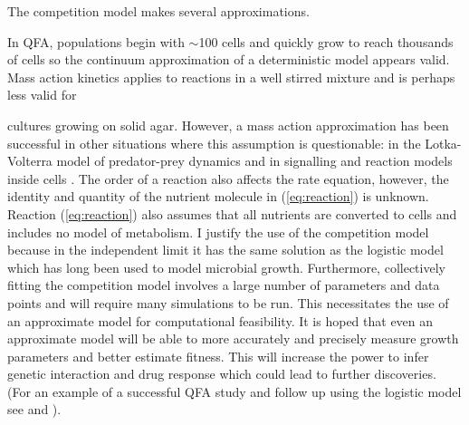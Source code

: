 
The competition model makes several approximations.


In QFA, populations begin with \(\sim\)100 cells and quickly grow to
reach thousands of cells so the continuum approximation of a
deterministic model appears valid. Mass action kinetics applies to
reactions in a well stirred mixture and is perhaps less valid for

cultures growing on solid agar. However, a mass action approximation
has been successful in other situations where this assumption is
questionable: in the Lotka-Volterra model of predator-prey dynamics
\citep{Berryman1992} and in signalling and reaction models inside
cells \citep{Aldridge2006,Chen2010}. The order of a reaction also
affects the rate equation, however, the identity and quantity of the
nutrient molecule in (\ref{eq:reaction}) is unknown. Reaction
(\ref{eq:reaction}) also assumes that all nutrients are converted to
cells and includes no model of metabolism. I justify the use of the
competition model because in the independent limit it has the same
solution as the logistic model which has long been used to model
microbial growth. Furthermore, collectively fitting the competition
model involves a large number of parameters and data points and will
require many simulations to be run. This necessitates the use of an
approximate model for computational feasibility. It is hoped that even
an approximate model will be able to more accurately and precisely
measure growth parameters and better estimate fitness. This will
increase the power to infer genetic interaction and drug response
which could lead to further discoveries. (For an example of a
successful QFA study and follow up using the logistic model see
\citet{Addinall2011} and \citet{Holstein20141259}).



